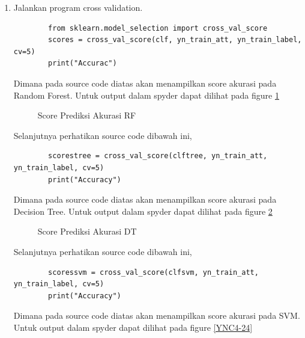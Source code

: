 \begin{enumerate}
\item Jalankan program cross validation.

	\begin{verbatim}
		from sklearn.model_selection import cross_val_score
		scores = cross_val_score(clf, yn_train_att, yn_train_label, cv=5)
		print("Accurac")
	\end{verbatim}

Dimana pada source code diatas akan menampilkan score akurasi pada Random Forest. Untuk output dalam spyder dapat dilihat pada figure \ref{YNC4-22}

	\begin{figure}[ht]
		\caption{Score Prediksi Akurasi RF}
		\label{YNC4-22}
	\end{figure}

Selanjutnya perhatikan source code dibawah ini,

	\begin{verbatim}
		scorestree = cross_val_score(clftree, yn_train_att, yn_train_label, cv=5)
		print("Accuracy")
	\end{verbatim}

Dimana pada source code diatas akan menampilkan score akurasi pada Decision Tree. Untuk output dalam spyder dapat dilihat pada figure \ref{YNC4-23}

	\begin{figure}[ht]
		\caption{Score Prediksi Akurasi DT}
		\label{YNC4-23}
	\end{figure}

Selanjutnya perhatikan source code dibawah ini,

	\begin{verbatim}
		scoressvm = cross_val_score(clfsvm, yn_train_att, yn_train_label, cv=5)
		print("Accuracy")
	\end{verbatim}

Dimana pada source code diatas akan menampilkan score akurasi pada SVM. Untuk output dalam spyder dapat dilihat pada figure \ref{YNC4-24}


\end{enumerate}
